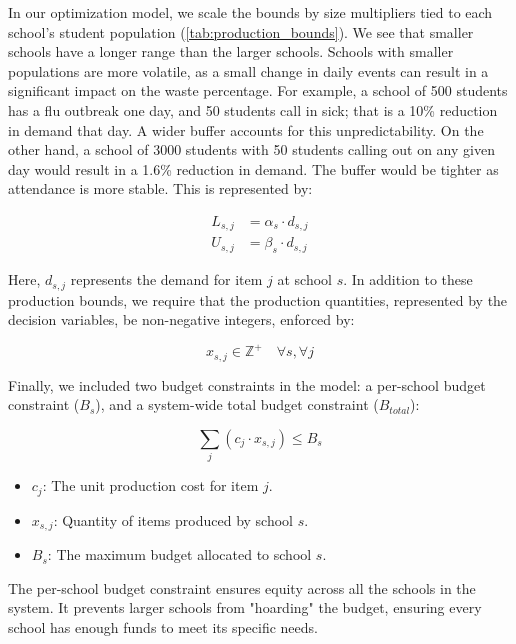 \documentclass{scrartcl}
\begin{document}
In our optimization model, we scale the bounds by size multipliers tied to each school's student population (\autoref{tab:production_bounds}). We see that smaller schools have a longer range than the larger schools. Schools with smaller populations are more volatile, as a small change in daily events can result in a significant impact on the waste percentage. For example, a school of 500 students has a flu outbreak one day, and 50 students call in sick; that is a 10\% reduction in demand that day. A wider buffer accounts for this unpredictability. On the other hand, a school of 3000 students with 50 students calling out on any given day would result in a 1.6\% reduction in demand. The buffer would be tighter as attendance is more stable. This is represented by:

\begin{equation}
    \begin{aligned}
        L_{s,j} &= \alpha_s \cdot d_{s,j} \\
        U_{s,j} &= \beta_s \cdot d_{s,j}
    \end{aligned}
\end{equation}

Here, $d_{s,j}$ represents the demand for item $j$ at school $s$. In addition to these production bounds, we require that the production quantities, represented by the decision variables, be non-negative integers, enforced by:

\begin{equation}
    x_{s,j} \in \mathbb{Z}^+ \quad \forall s, \forall j
\end{equation}

Finally, we included two budget constraints in the model: a per-school budget constraint ($B_s$), and a system-wide total budget constraint ($B_{total}$):

\begin{equation}
    \sum_{j} (c_{j} \cdot  x_{s,j}) \leq B_{s}
    \label{eq:school_budget}
\end{equation}

\begin{itemize}
    \item $c_j$: The unit production cost for item $j$.
    \item $x_{s,j}$: Quantity of items produced by school $s$.
    \item $B_s$: The maximum budget allocated to school $s$.
\end{itemize}

The per-school budget constraint ensures equity across all the schools in the system. It prevents larger schools from "hoarding" the budget, ensuring every school has enough funds to meet its specific needs.
\end{document}
